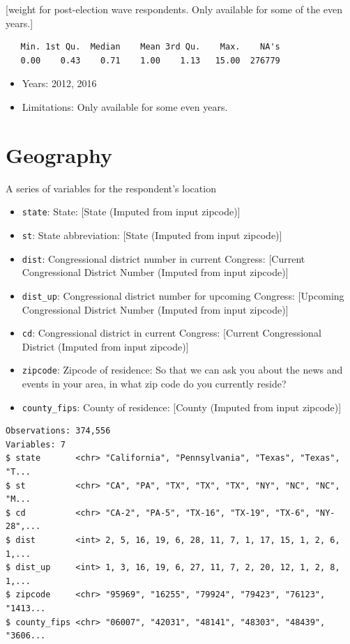 \documentclass[10pt,article,oneside]{memoir}
\theoremstyle{definition}
\begin{document}
{[}weight for post-election wave respondents. Only available for some of
the even years.{]}

\begin{verbatim}
   Min. 1st Qu.  Median    Mean 3rd Qu.    Max.    NA's 
   0.00    0.43    0.71    1.00    1.13   15.00  276779 
\end{verbatim}

\begin{itemize}
\tightlist
\item
  Years: 2012, 2016
\item
  Limitations: Only available for some even years.
\end{itemize}

\section{Geography}\label{geography}

A series of variables for the respondent's location

\begin{itemize}
\tightlist
\item
  \texttt{state}: State: {[}State (Imputed from input zipcode){]}
\item
  \texttt{st}: State abbreviation: {[}State (Imputed from input
  zipcode){]}
\item
  \texttt{dist}: Congressional district number in current Congress:
  {[}Current Congressional District Number (Imputed from input
  zipcode){]}
\item
  \texttt{dist\_up}: Congressional district number for upcoming
  Congress: {[}Upcoming Congressional District Number (Imputed from
  input zipcode){]}
\item
  \texttt{cd}: Congressional district in current Congress: {[}Current
  Congressional District (Imputed from input zipcode){]}
\item
  \texttt{zipcode}: Zipcode of residence: So that we can ask you about
  the news and events in your area, in what zip code do you currently
  reside?
\item
  \texttt{county\_fips}: County of residence: {[}County (Imputed from
  input zipcode){]}
\end{itemize}

\begin{verbatim}
Observations: 374,556
Variables: 7
$ state       <chr> "California", "Pennsylvania", "Texas", "Texas", "T...
$ st          <chr> "CA", "PA", "TX", "TX", "TX", "NY", "NC", "NC", "M...
$ cd          <chr> "CA-2", "PA-5", "TX-16", "TX-19", "TX-6", "NY-28",...
$ dist        <int> 2, 5, 16, 19, 6, 28, 11, 7, 1, 17, 15, 1, 2, 6, 1,...
$ dist_up     <int> 1, 3, 16, 19, 6, 27, 11, 7, 2, 20, 12, 1, 2, 8, 1,...
$ zipcode     <chr> "95969", "16255", "79924", "79423", "76123", "1413...
$ county_fips <chr> "06007", "42031", "48141", "48303", "48439", "3606...
\end{verbatim}
\end{document}
